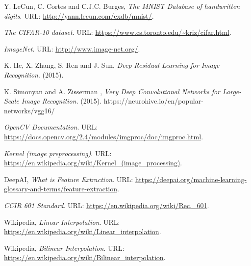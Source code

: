 

\begin{thebibliography}{3}
\frenchspacing



Y. LeCun, C. Cortes and C.J.C. Burges,
\emph{The MNIST Database of handwritten digits}.
URL: \url{http://yann.lecun.com/exdb/mnist/}.


\emph{The CIFAR-10 dataset}.
URL: \url{https://www.cs.toronto.edu/~kriz/cifar.html}.

\emph{ImageNet}.
URL: \url{http://www.image-net.org/}.


K. He, X. Zhang, S. Ren and J. Sun,
\emph{Deep Residual Learning for Image Recognition}.
(2015).


K. Simonyan and A. Zisserman
, \emph{Very Deep Convolutional Networks for Large-Scale Image Recognition}.
(2015).
https://neurohive.io/en/popular-networks/vgg16/%


\emph{OpenCV Documentation}.
URL: \url{https://docs.opencv.org/2.4/modules/imgproc/doc/imgproc.html}.


\emph{Kernel (image preprocessing)}.
URL: \url{https://en.wikipedia.org/wiki/Kernel_(image_processing)}.


DeepAI,
\emph{What is Feature Extraction}.
URL: \url{https://deepai.org/machine-learning-glossary-and-terms/feature-extraction}.


\emph{CCIR 601 Standard}.
URL: \url{https://en.wikipedia.org/wiki/Rec._601}.

Wikipedia,
\emph{Linear Interpolation}.
URL: \url{https://en.wikipedia.org/wiki/Linear_interpolation}.


Wikipedia,
\emph{Bilinear Interpolation}.
URL: \url{https://en.wikipedia.org/wiki/Bilinear_interpolation}.


\end{thebibliography}
